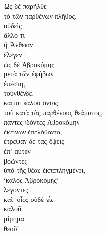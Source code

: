 {\large
\begin{greek}
\noindent Ὡς δὲ παρῆλθε \\
τὸ τῶν παρθένων πλῆθος, \\
οὐδεὶς \\
\tabto{2em} ἄλλο τι \\
\tabto{2em} ἢ Ἄνθειαν \\
ἔλεγεν· \\
ὡς δὲ Ἁβροκόμης \\
\tabto{2em} μετὰ τῶν ἐφήβων \\
ἐπέστη, \\
τοὐνθένδε, \\
καίτοι καλοῦ ὄντος \\
\tabto{2em} τοῦ κατὰ τὰς παρθένους θεάματος, \\
πάντες ἰδόντες Ἁβροκόμην \\
ἐκείνων ἐπελάθοντο, \\
ἔτρεψαν δὲ τὰς ὄψεις \\
\tabto{2em} ἐπ' αὐτὸν \\
βοῶντες \\
\tabto{2em} ὑπὸ τῆς θέας ἐκπεπληγμένοι, \\
\tabto{2em} `καλὸς Ἁβροκόμης'\\
λέγοντες, \\
καὶ `οἷος οὐδὲ εἷς \\
\tabto{4em} καλοῦ \\
\tabto{2em} μίμημα \\
\tabto{4em} θεοῦ'.\\

\end{greek}
}

